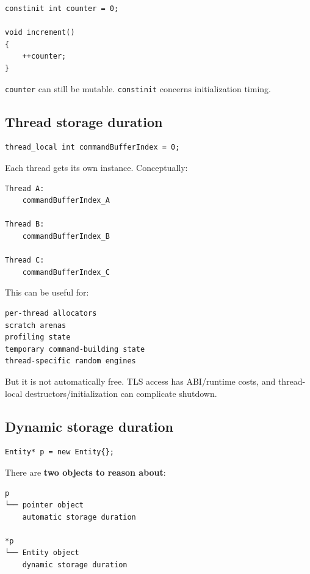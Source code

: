 \begin{verbatim}
constinit int counter = 0;

void increment()
{
    ++counter;
}
\end{verbatim}

\texttt{counter} can still be mutable. \texttt{constinit} concerns initialization timing.

\subsection{Thread storage duration}\label{01-foundations-i-ch002-thread-storage-duration}

\begin{verbatim}
thread_local int commandBufferIndex = 0;
\end{verbatim}

Each thread gets its own instance. Conceptually:

\begin{verbatim}
Thread A:
    commandBufferIndex_A

Thread B:
    commandBufferIndex_B

Thread C:
    commandBufferIndex_C
\end{verbatim}

This can be useful for:

\begin{verbatim}
per-thread allocators
scratch arenas
profiling state
temporary command-building state
thread-specific random engines
\end{verbatim}

But it is not automatically free. TLS access has ABI/runtime costs, and thread-local destructors/initialization can complicate shutdown.

\subsection{Dynamic storage duration}\label{01-foundations-i-ch002-dynamic-storage-duration}

\begin{verbatim}
Entity* p = new Entity{};
\end{verbatim}

There are \textbf{two objects to reason about}:

\begin{verbatim}
p
└── pointer object
    automatic storage duration

*p
└── Entity object
    dynamic storage duration
\end{verbatim}

